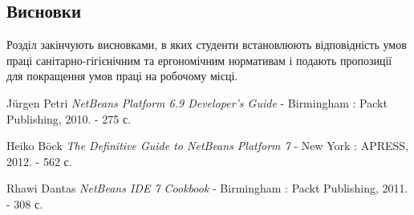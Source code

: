\documentclass[12pt,a4paper]{article}
\begin{document}
\subsection{Висновки}
Розділ закінчують висновками, в яких студенти встановлюють відповідність умов праці санітарно-гігієнічним та ергономічним нормативам і подають пропозиції для покращення умов праці на робочому місці. 

\clearpage

\begin{thebibliography}{9}



  Jürgen Petri \emph{NetBeans Platform 6.9 Developer's Guide}
     - Birmingham : Packt Publishing, 2010. - 275 с.

  Heiko Böck \emph{The Definitive Guide to NetBeans Platform 7}
     - New York : APRESS, 2012. - 562 с.

  Rhawi Dantas \emph{NetBeans IDE 7 Cookbook}
     - Birmingham : Packt Publishing, 2011. - 308 с.


















\end{thebibliography}
\end{document}

